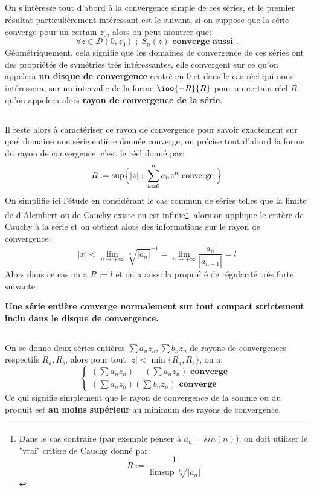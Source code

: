 \subsection*{}
On s'intéresse tout d'abord à la convergence simple de ces séries, et le premier résultat particulièrement intéressant est le suivant, si on suppose que la série converge pour un certain \(z_0\), alors on peut montrer que:
\[
   \forall z \in \mathcal{D}(0, z_0) \; ; \; S_n(z) \textbf{ converge aussi }.
\]
Géométriquement, cela signifie que les domaines de convergence de ces séries ont des propriétés de symétries trés intéressantes, elle convergent sur ce qu'on appelera \textbf{un disque de convergence} centré en \(0\) et dans le cas réel qui nous intéressera, sur un intervalle de la forme \(\ioo{-R}{R}\) pour un certain réel \(R\) qu'on appelera alors \textbf{rayon de convergence de la série}.

\subsection*{}
Il reste alors à caractériser ce rayon de convergence pour savoir exactement sur quel domaine une série entière donnée converge, on précise tout d'abord la forme du rayon de convergence, c'est le réel donné par:
\[
   R := \sup \Bigl\{ |z| \; ; \; \sum_{k=0}^{n} a_nz^n \text{ converge } \Bigl\}   
\]
On simplifie ici l'étude en considérant le cas commun de séries telles que la limite de d'Alembert ou de Cauchy existe ou est infinie\footnote[2]{Dans le cas contraire (par exemple penser à \(a_n = sin(n)\)), on doit utiliser le "vrai" critère de Cauchy donné par:\[R:= \frac{1}{\limsup{\sqrt[n]{|a_n|}}}\]}, alors on applique le critère de Cauchy à la série et on obtient alors des informations sur le rayon de convergence:
\[
   |x| < \lim_{n \rightarrow +\infty}\sqrt[n]{|a_n|}^{-1} = \lim_{n \rightarrow +\infty} \frac{|a_n|}{|a_{n+1}|} = l
\]
Alors dans ce cas on a \(R := l\) et on a aussi la propriété de régularité trés forte suivante:
\begin{center}
   \textbf{Une série entière converge normalement sur tout compact strictement inclu dans le disque de convergence.}
\end{center}
\subsection*{}
On se donne deux séries entières \(\sum a_nz_n, \sum b_nz_n\) de rayons de convergences respectifs \(R_a, R_b\), alors pour tout \(|z| < \min\{R_a, R_b\}\), on a:
\[
   \begin{cases}
      \left(\sum a_nz_n\right) + \left(\sum a_nz_n\right) \textbf{ converge }\\
      \left(\sum a_nz_n\right)\left(\sum b_nz_n\right) \textbf{ converge }
   \end{cases}
\]
Ce qui signifie simplement que le rayon de convergence de la somme ou du produit est \textbf{au moins supérieur} au minimum des rayons de convergence.

